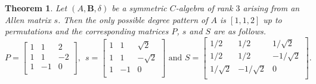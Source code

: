 \documentclass[12pt]{amsart}
\newtheorem{thm}{Theorem}
\begin{document}
\begin{thm}\label{p3}
Let $(A,{{\mathbf B}}, \delta)$ be a symmetric $C$-algebra of rank $3$ arising from an Allen matrix $s$. Then the only possible degree pattern of $A$ is $[1,1,2]$ up to permutations and the corresponding matrices $P$, $s$ and $S$ are as follows.
$$P=\left[
   \begin{array}{ccc}
     1 & 1 & 2 \\
     1 & 1 & -2\\
     1 & -1 & 0 \\
   \end{array}
 \right],~~
s=\left[
   \begin{array}{ccc}
     1 & 1 & \sqrt2 \\
     1 & 1 & -\sqrt2\\
     1 & -1 & 0 \\
   \end{array}
 \right] \mbox{ and } S=\left[
   \begin{array}{ccc}
     1/2 & 1/2 & 1/\sqrt2 \\
     1/2 & 1/2 & -1/\sqrt2\\
     1/\sqrt2 & -1/\sqrt2 & 0 \\
   \end{array}
 \right].
$$
\end{thm}
\end{document}
